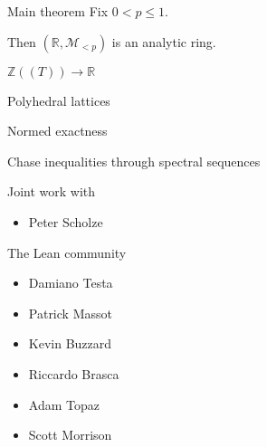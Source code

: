 \documentclass[12pt,aspectratio=169]{beamer}
\def\Z{\mathbb{Z}}
\def\R{\mathbb{R}}
\begin{document}
\begin{frame}{Main theorem}
	Fix $0 < p \le 1$.
	
	Then $(\R, \mathcal M_{< p})$ is an analytic ring.
\end{frame}

\begin{frame}
\end{frame}

\begin{frame}
	$\Z((T)) \to \R$

	\pause

	Polyhedral lattices

	\pause

	Normed exactness

	\pause

	Chase inequalities through spectral sequences
\end{frame}

\begin{frame}{Joint work with}
	\begin{itemize}
		\item Peter Scholze
	\end{itemize}

	The Lean community
	\begin{itemize}
		\item Damiano Testa
		\item Patrick Massot
		\item Kevin Buzzard
		\item Riccardo Brasca
		\item Adam Topaz
		\item Scott Morrison
	\end{itemize}
\end{frame}
\end{document}
